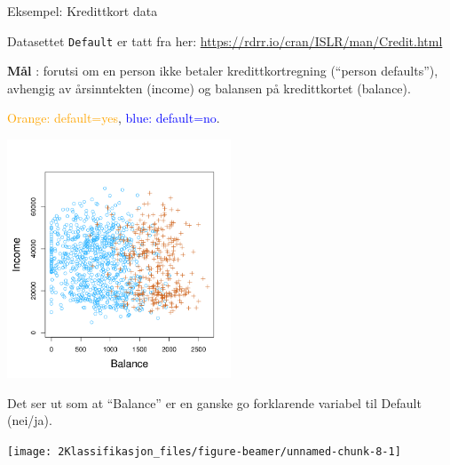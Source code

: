 \documentclass[10pt,ignorenonframetext,]{beamer}
\begin{document}
\begin{frame}[fragile]

\begin{block}{Eksempel: Kredittkort data}

\vspace{2mm}

Datasettet \texttt{Default} er tatt fra her:
\url{https://rdrr.io/cran/ISLR/man/Credit.html}

\vspace{2mm}

\textbf{Mål} : forutsi om en person ikke betaler kredittkortregning
(``person defaults''), avhengig av årsinntekten (income) og balansen på
kredittkortet (balance).

\textcolor{orange}{Orange: default=yes},
\textcolor{blue}{blue: default=no}.

\centering
\includegraphics[width=0.5\textwidth,height=\textheight]{4.1a.png}

\end{block}

\end{frame}

\begin{frame}

Det ser ut som at ``Balance'' er en ganske go forklarende variabel til
Default (nei/ja).

\begin{center}\texttt{[image: 2Klassifikasjon\_files/figure-beamer/unnamed-chunk-8-1]} \end{center}

\end{frame}
\end{document}
